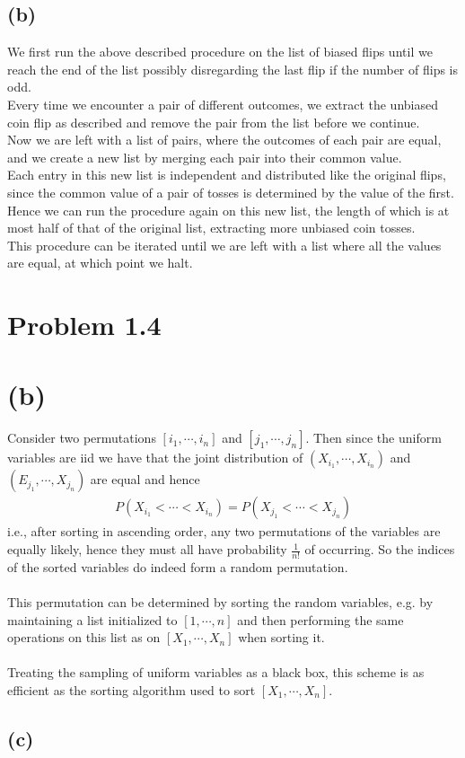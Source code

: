 \documentclass[11pt]{article}
\begin{document}
\subsection*{(b)}
We first run the above described procedure on the list of biased flips until we reach the end of the list
possibly disregarding the last flip if the number of flips is odd. \\
Every time we encounter a pair of different outcomes, we extract the unbiased coin flip as described and remove the pair from the list
before we continue. \\
Now we are left with a list of pairs, where the outcomes of each pair are equal,
and we create a new list by merging each pair into their common value. \\
Each entry in this new list is independent and distributed like the original flips,
since the common value of a pair of tosses is determined by the value of the first. 
Hence we can run the procedure again on this new list, the length of which is at most half of that of the original list, 
extracting more unbiased coin tosses. \\
This procedure can be iterated until we are left with a list where all the values are equal,
at which point we halt.
\section*{Problem 1.4}
\section*{(b)}
Consider two permutations $\left[ i_1,\cdots,i_n \right]$ and $\left[ j_1,\cdots,j_n \right]$.
Then since the uniform variables are iid we have that the joint distribution of
$\left( X_{i_1},\cdots, X_{i_n} \right)$ and
$\left( E_{j_1},\cdots,X_{j_n} \right)$
are equal and hence
\begin{align*}
	P\left( X_{i_1}<\cdots<X_{i_n} \right)=P\left( X_{j_1}<\cdots<X_{j_n} \right)
\end{align*}
i.e., after sorting in ascending order, any two permutations of the variables are equally likely, 
hence they must all have probability $\frac{1}{n!}$ of occurring. 
So the indices of the sorted variables do indeed form a random permutation. \\ \\
This permutation can be determined by sorting the random variables, 
e.g. by maintaining a list initialized to $\left[ 1,\cdots,n \right]$ 
and then performing the same operations on this list as on $\left[ X_1,\cdots,X_n \right]$ 
when sorting it. \\ \\
Treating the sampling of uniform variables as a black box,
this scheme is as efficient as the sorting algorithm used to sort $\left[ X_1,\cdots,X_n \right]$.
\subsection*{(c)}
\end{document}
